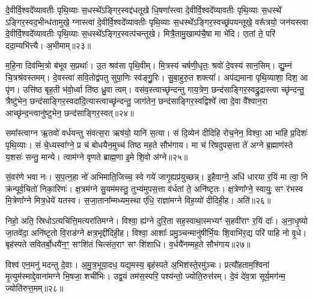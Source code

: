 दे॒वीर्वि॒श्वदे᳚व्यावतीः पृथि॒व्याः स॒धस्थे᳚\-ऽङ्गिर॒स्वद्द॑धतूखे धि॒षणा᳚स्त्वा दे॒वीर्वि॒श्वदे᳚व्यावतीः पृथि॒व्याः स॒धस्थे᳚ \-ऽङ्गिर॒स्वद॒भीन्ध॑तामुखे॒ ग्नास्त्वा॑ दे॒वीर्वि॒श्वदे᳚व्यावतीः पृथि॒व्याः स॒धस्थे᳚\-ऽङ्गिर॒स्वच्छ्र॑पयन्तूखे॒ वरू᳚त्रयो॒ जन॑यस्त्वा दे॒वीर्वि॒श्वदे᳚व्यावतीः पृथि॒व्याः स॒धस्थे᳚\-ऽङ्गिर॒स्वत्प॑चन्तूखे। मित्रै॒तामु॒खाम्प॑चै॒षा मा भे॑दि। एातां ते॒ परि॑ ददा॒म्यभि॑त्त्यै। अ॒भीमाम्॥२३॥

म॒हि॒ना दिव॑म्मि॒त्रो ब॑भूव स॒प्रथाः᳚। उ॒त श्रव॑सा पृथि॒वीम्। मि॒त्रस्य॑ चर्\mbox{}षणी॒धृतः॒ श्रवो॑ दे॒वस्य॑ सान॒सिम्। द्यु॒म्नं चि॒त्रश्र॑वस्तमम्। दे॒वस्त्वा॑ सवि॒तोद्व॑पतु सुपा॒णिः स्व॑ङ्गु॒॒रिः। सु॒बा॒हुरु॒त शक्त्या᳚। अप॑द्यमाना पृथि॒व्याशा॒ दिश॒ आ पृ॑ण। उत्ति॑ष्ठ बृह॒ती भ॑वो॒र्ध्वा ति॑ष्ठ ध्रु॒वा त्वम्। वस॑व॒स्त्वाच्छृ॑न्दन्तु गाय॒त्रेण॒ छन्द॑साङ्गिर॒स्वद्रु॒द्रास्त्वा च्छृ॑न्दन्तु॒ त्रैष्टु॑भेन॒ छन्द॑साङ्गिर॒स्वदा॑दि॒त्यास्त्वाच्छृ॑न्दन्तु॒ जाग॑तेन॒ छन्द॑साङ्गिर॒स्वद्विश्वे᳚ त्वा दे॒वा वै᳚श्वान॒रा आच्छृ॑न्द॒न्त्वानु॑ष्टुभेन॒ छन्द॑साङ्गिर॒स्वत्॥२४॥

{\anuvakamend[{पत्नी॑रि॒माꣳ रु॒द्रास्त्वाच्छृ॑न्द॒न्त्वेका॒न्नविꣳ॑श॒तिश्च॑॥६॥}]}

समा᳚स्त्वाग्न ऋ॒तवो॑ वर्धयन्तु संवत्स॒रा ऋष॑यो॒ यानि॑ स॒त्या। सं दि॒व्येन॑ दीदिहि रोच॒नेन॒ विश्वा॒ आ भा॑हि प्र॒दिशः॑ पृथि॒व्याः। सं चे॒ध्यस्वा᳚ग्ने॒ प्र च॑ बोधयैन॒मुच्च॑ तिष्ठ मह॒ते सौभ॑गाय। मा च॑ रिषदुपस॒त्ता ते॑ अग्ने ब्र॒ह्माण॑स्ते य॒शसः॑ सन्तु॒ मान्ये। त्वाम॑ग्ने वृणते ब्राह्म॒णा इ॒मे शि॒वो अ॑ग्ने॥२५॥

सं॒वर॑णे भवा नः। स॒प॒त्न॒हा नो॑ अभिमाति॒जिच्च॒ स्वे गये॑ जागृ॒ह्यप्र॑युच्छन्न्। इ॒हैवाग्ने॒ अधि॑ धारया र॒यिं मा त्वा॒ नि क्र॑न्पूर्व॒चितो॑ निका॒रिणः॑। क्ष॒त्रम॑ग्ने सु॒यम॑मस्तु॒ तुभ्य॑मुपस॒त्ता व॑र्धतां ते॒ अनि॑ष्टृतः। क्ष॒त्रेणा᳚ग्ने॒ स्वायुः॒ सꣳ र॑भस्व मि॒त्रेणा᳚ग्ने मित्र॒धेये॑ यतस्व। स॒जा॒ताना᳚म्मध्यम॒स्था ए॑धि॒ राज्ञा॑मग्ने विह॒व्यो॑ दीदिही॒ह। अति॑॥२६॥

निहो॒ अति॒ स्रिधो\-ऽत्यचि॑त्ति॒मत्यरा॑तिमग्ने। विश्वा॒ ह्य॑ग्ने दुरि॒ता सह॒स्वाथा॒स्मभ्यꣳ॑ स॒हवी॑राꣳ र॒यिं दाः᳚। अ॒ना॒धृ॒ष्यो जा॒तवे॑दा॒ अनि॑ष्टृतो वि॒राड॑ग्ने क्षत्र॒भृद्दी॑दिही॒ह। विश्वा॒ आशाः᳚ प्रमु॒ञ्चन्मानु॑षीर्भि॒यः शि॒वाभि॑र॒द्य परि॑ पाहि नो वृ॒धे। बृह॑स्पते सवितर्बो॒धयै॑न॒ꣳ॒ सꣳशि॑तं चित्संत॒राꣳ सꣳ शि॑शाधि। व॒र्धयै॑नम्मह॒ते सौभ॑गाय॥२७॥

विश्व॑ एन॒मनु॑ मदन्तु दे॒वाः। अ॒मु॒त्र॒भूया॒दध॒ यद्य॒मस्य॒ बृह॑स्पते अ॒भिश॑स्ते॒रमु॑ञ्चः। प्रत्यौ॑हताम॒श्विना॑ मृ॒त्युम॑स्माद्दे॒वाना॑मग्ने भि॒षजा॒ शची॑भिः। उद्व॒यं तम॑स॒स्परि॒ पश्य॑न्तो॒ ज्योति॒रुत्त॑रम्। दे॒वं दे॑व॒त्रा सूर्य॒मग॑न्म॒ ज्योति॑रुत्त॒मम्॥२८॥

